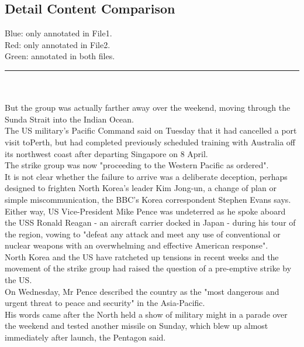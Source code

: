 \documentclass[runningheads,a4paper]{llncs}
\begin{document}
\begin{CJK*}{UTF8}{gbsn}
\section{Detail Content Comparison}
\colorbox{blue!30}{Blue}: only annotated in File1.\\
\colorbox{red!30}{Red}: only annotated in File2.\\
\colorbox{green!30}{Green}: annotated in both files.\\
\rule{5cm}{0.1em}\\
\vspace{0.3cm}\\
But the group was actually farther away over the weekend, moving through \colorbox{blue!30}{the }\colorbox{green!30}{Sunda Strait} into the \colorbox{red!30}{Indian Ocean}.\\
The \colorbox{green!30}{US} military's \colorbox{blue!30}{Pacific }\colorbox{green!30}{Command} said on Tuesday that it had cancelled a port visit to\colorbox{green!30}{Perth}, but had completed previously scheduled training with \colorbox{blue!30}{Australia} off its northwest coast after departing \colorbox{green!30}{Singapore} on 8 April.\\
The strike group was now "proceeding to \colorbox{blue!30}{the Western Pacific} as ordered".\\
It is not clear whether the failure to arrive was a deliberate deception, perhaps designed to frighten North Korea's leader \colorbox{red!30}{Kim Jong-un}, a change of plan or simple miscommunication, the \colorbox{red!30}{BBC's Korea correspondent Stephen Evans} says.\\
Either way, US Vice-President Mike Pence was undeterred as he spoke aboard the USS Ronald Reagan - an aircraft carrier docked in Japan - during his tour of the region, vowing to "defeat any attack and meet any use of conventional or nuclear weapons with an overwhelming and effective American response".\\
North Korea and the US have ratcheted up tensions in recent weeks and the movement of the strike group had raised the question of a pre-emptive strike by the US.\\
On Wednesday, Mr Pence described the country as the "most dangerous and urgent threat to peace and security" in the Asia-Pacific.\\
His words came after the North held a show of military might in a parade over the weekend and tested another missile on Sunday, which blew up almost immediately after launch, the Pentagon said.\\

\end{CJK*}
\end{document}
